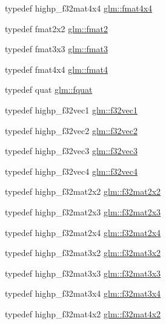 \begin{DoxyCompactItemize}
\item 
typedef highp\-\_\-f32mat4x4 \hyperlink{group__gtc__type__precision_gaa641dae0fcc277f028b4e48e16bbea86}{glm\-::fmat4x4}
\item 
typedef fmat2x2 \hyperlink{group__gtc__type__precision_ga96b15c5eaecce87b352dab5d373da979}{glm\-::fmat2}
\item 
typedef fmat3x3 \hyperlink{group__gtc__type__precision_gaa7b09502b183884aca53338c35b09509}{glm\-::fmat3}
\item 
typedef fmat4x4 \hyperlink{group__gtc__type__precision_gafbea1649c5384f13ff4595c9d0003a68}{glm\-::fmat4}
\item 
typedef quat \hyperlink{group__gtc__type__precision_gaa95d73f08018f3864c6ae08dbf1c59f2}{glm\-::fquat}
\item 
typedef highp\-\_\-f32vec1 \hyperlink{group__gtc__type__precision_ga7335bddf7a09ba275d5d04f7681f03e6}{glm\-::f32vec1}
\item 
typedef highp\-\_\-f32vec2 \hyperlink{group__gtc__type__precision_ga0eba48c6b8abbee31dbf5655dd171ead}{glm\-::f32vec2}
\item 
typedef highp\-\_\-f32vec3 \hyperlink{group__gtc__type__precision_ga9b74939fb3bdd450be65f798037dd79d}{glm\-::f32vec3}
\item 
typedef highp\-\_\-f32vec4 \hyperlink{group__gtc__type__precision_gab6254ab9d409cce6579d7dc75dd34114}{glm\-::f32vec4}
\item 
typedef highp\-\_\-f32mat2x2 \hyperlink{group__gtc__type__precision_ga4eb16d89ecff72fa77f10c9a1e7ca475}{glm\-::f32mat2x2}
\item 
typedef highp\-\_\-f32mat2x3 \hyperlink{group__gtc__type__precision_ga5ad96c3a7d4c81520d1f30bf5dcdc2b6}{glm\-::f32mat2x3}
\item 
typedef highp\-\_\-f32mat2x4 \hyperlink{group__gtc__type__precision_gaba05bfeff59b12ea8e8ad2f6bfd8eece}{glm\-::f32mat2x4}
\item 
typedef highp\-\_\-f32mat3x2 \hyperlink{group__gtc__type__precision_ga43fa9ba1875db74cba2cea33321a77ff}{glm\-::f32mat3x2}
\item 
typedef highp\-\_\-f32mat3x3 \hyperlink{group__gtc__type__precision_ga56465dc40dd0e35221f00bdf44fb7c2e}{glm\-::f32mat3x3}
\item 
typedef highp\-\_\-f32mat3x4 \hyperlink{group__gtc__type__precision_ga9d953c44b7bf260d2f2e61d73dc2ab08}{glm\-::f32mat3x4}
\item 
typedef highp\-\_\-f32mat4x2 \hyperlink{group__gtc__type__precision_ga6aee56c6561190811699bfd2b1cd0d57}{glm\-::f32mat4x2}

\end{DoxyCompactItemize}
